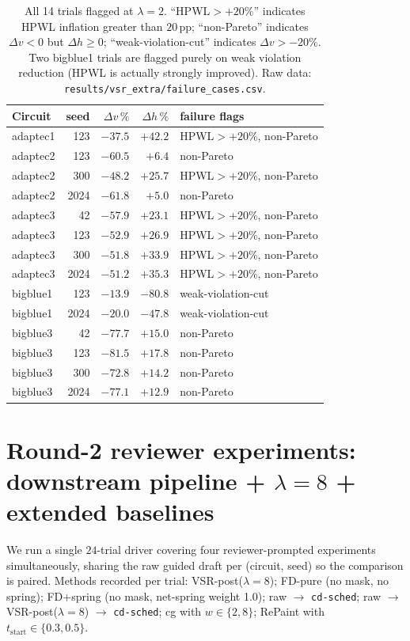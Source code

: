 \documentclass{article}
\begin{document}
\begin{table}[h]
\centering
\small
\begin{tabular}{lrrrl}
\toprule
Circuit & seed & $\Delta v\,\%$ & $\Delta h\,\%$ & failure flags \\
\midrule
adaptec1 & 123  & $-37.5$ & $+42.2$ & HPWL$>+20\%$, non-Pareto \\
adaptec2 & 123  & $-60.5$ &  $+6.4$ & non-Pareto \\
adaptec2 & 300  & $-48.2$ & $+25.7$ & HPWL$>+20\%$, non-Pareto \\
adaptec2 & 2024 & $-61.8$ &  $+5.0$ & non-Pareto \\
adaptec3 & 42   & $-57.9$ & $+23.1$ & HPWL$>+20\%$, non-Pareto \\
adaptec3 & 123  & $-52.9$ & $+26.9$ & HPWL$>+20\%$, non-Pareto \\
adaptec3 & 300  & $-51.8$ & $+33.9$ & HPWL$>+20\%$, non-Pareto \\
adaptec3 & 2024 & $-51.2$ & $+35.3$ & HPWL$>+20\%$, non-Pareto \\
bigblue1 & 123  & $-13.9$ & $-80.8$ & weak-violation-cut \\
bigblue1 & 2024 & $-20.0$ & $-47.8$ & weak-violation-cut \\
bigblue3 & 42   & $-77.7$ & $+15.0$ & non-Pareto \\
bigblue3 & 123  & $-81.5$ & $+17.8$ & non-Pareto \\
bigblue3 & 300  & $-72.8$ & $+14.2$ & non-Pareto \\
bigblue3 & 2024 & $-77.1$ & $+12.9$ & non-Pareto \\
\bottomrule
\end{tabular}
\caption{All 14 trials flagged at $\lambda{=}2$.  ``HPWL$>+20\%$'' indicates
HPWL inflation greater than $20$\,pp; ``non-Pareto'' indicates
$\Delta v < 0$ but $\Delta h \geq 0$; ``weak-violation-cut'' indicates
$\Delta v > -20\%$.  Two bigblue1 trials are flagged purely on weak
violation reduction (HPWL is actually strongly improved).
Raw data: \texttt{results/vsr\_extra/failure\_cases.csv}.}
\label{tab:supp-failures}
\end{table}

\section{Round-2 reviewer experiments: downstream pipeline + $\lambda{=}8$ + extended baselines}
\label{sec:supp-round2}

We run a single $24$-trial driver covering four reviewer-prompted
experiments simultaneously, sharing the raw guided draft per
(circuit, seed) so the comparison is paired.  Methods recorded per
trial: VSR-post($\lambda{=}8$); FD-pure (no mask, no spring);
FD+spring (no mask, net-spring weight 1.0); raw $\to$ \texttt{cd-sched};
raw $\to$ VSR-post($\lambda{=}8$) $\to$ \texttt{cd-sched}; cg with
$w\in\{2,8\}$; RePaint with $t_\text{start}\in\{0.3, 0.5\}$.
\end{document}
